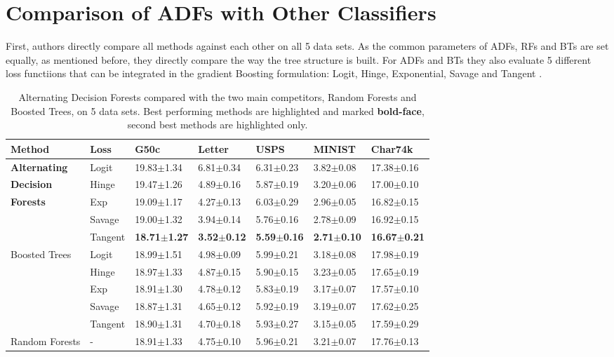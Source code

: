 \documentclass[10pt,twocolumn,letterpaper]{article}
\begin{document}
\section{Comparison of ADFs with Other Classifiers}

First, authors directly compare all methods against each other on all 5 data sets. As the common parameters of ADFs, RFs and BTs are set equally, as mentioned before, they directly compare the way the tree structure is built. For ADFs and BTs they also evaluate 5 different loss functiions that can be integrated in the gradient Boosting formulation: Logit,  Hinge, Exponential, Savage \cite{Fast} and Tangent \cite{On}.

\begin{table*}
\begin{center}
\begin{tabular}{p{2.5cm}p{2cm}p{2cm}p{2cm}p{2cm}p{2cm}p{2cm}}
  \hline
  Method & Loss & G50c & Letter & USPS & MINIST & Char74k \\
  \hline
  {\bf Alternating} & Logit & 19.83$\pm$1.34 & 6.81$\pm$0.34 & 6.31$\pm$0.23 &
  3.82$\pm$0.08 & 17.38$\pm$0.16 \\
  {\bf Decision} & Hinge & 19.47$\pm$1.26 & 4.89$\pm$0.16 & 5.87$\pm$0.19 &
  3.20$\pm$0.06 & 17.00$\pm$0.10 \\
  {\bf Forests} & Exp & 19.09$\pm$1.17 & 4.27$\pm$0.13 & 6.03$\pm$0.29 &
  2.96$\pm$0.05 & 16.82$\pm$0.15 \\
  ~ & Savage \cite{Fast} & 19.00$\pm$1.32 & 3.94$\pm$0.14 & 5.76$\pm$0.16 & 
  2.78$\pm$0.09 & 16.92$\pm$0.15 \\
  ~ & Tangent \cite{On} & {\bf 18.71$\pm$1.27} & {\bf 3.52$\pm$0.12} & 
  {\bf 5.59$\pm$0.16} & {\bf 2.71$\pm$0.10} & {\bf 16.67$\pm$0.21} \\
  \cline{1-2}
  Boosted Trees \cite{The} & Logit & 18.99$\pm$1.51 & 4.98$\pm$0.09 & 
  5.99$\pm$0.21 & 3.18$\pm$0.08 & 17.98$\pm$0.19 \\
  ~ & Hinge & 18.97$\pm$1.33 & 4.87$\pm$0.15 & 5.90$\pm$0.15 & 
  3.23$\pm$0.05 & 17.65$\pm$0.19 \\
  ~ & Exp & 18.91$\pm$1.30 & 4.78$\pm$0.12 & 5.83$\pm$0.19 & 
  3.17$\pm$0.07 & 17.57$\pm$0.10 \\
  ~ & Savage \cite{Fast} & 18.87$\pm$1.31 & 4.65$\pm$0.12 & 
  5.92$\pm$0.19 & 3.19$\pm$0.07 & 17.62$\pm$0.25 \\
  ~ & Tangent \cite{On} & 18.90$\pm$1.31 & 4.70$\pm$0.18 & 
  5.93$\pm$0.27 & 3.15$\pm$0.05 & 17.59$\pm$0.29 \\
  \cline{1-2}
  Random Forests & - & 18.91$\pm$1.33 & 4.75$\pm$0.10 & 
  5.96$\pm$0.21 & 3.21$\pm$0.07 & 17.76$\pm$0.13 \\
  \hline
\end{tabular}
\end{center}
\caption{Alternating Decision Forests compared with the two main competitors, Random Forests and Boosted Trees, on 5 data sets. Best performing methods are highlighted and marked {\bf bold-face}, second best methods are highlighted only.}
\label{tab1}
\end{table*}
\end{document}
